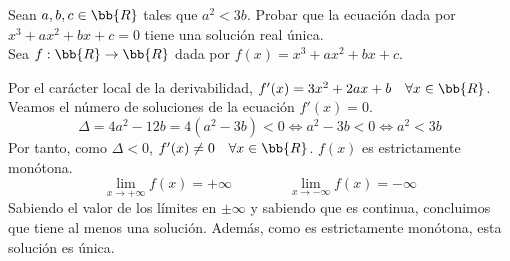 \begin{ejercicio}
    Sean $a,b,c \in \bb{R}$ tales que $a^2<3b$. Probar que la ecuación dada por $x^3+ax^2+bx+c=0$ tiene una solución real única.\\

    Sea $f:\bb{R} \to \bb{R}$ dada por $f(x)=x^3+ax^2+bx+c$.
    
    Por el carácter local de la derivabilidad, $f'(x)=3x^2+2ax+b \quad \forall x\in \bb{R}$. Veamos el número de soluciones de la ecuación $f'(x)=0$.
    $$\Delta = 4a^2 -12b = 4(a^2-3b) < 0 \Longleftrightarrow a^2-3b < 0 \Longleftrightarrow a^2 < 3b$$
    Por tanto, como $\Delta < 0$, $f'(x)\neq0 \quad \forall x \in \bb{R}$. $f(x)$ es estrictamente monótona.
    \begin{equation*}
        \lim_{x\to +\infty} f(x) = +\infty \qquad \qquad \lim_{x\to -\infty} f(x) = -\infty
    \end{equation*}
    Sabiendo el valor de los límites en $\pm \infty$ y sabiendo que es continua, concluimos que tiene al menos una solución. Además, como es estrictamente monótona, esta solución es única.
\end{ejercicio}

